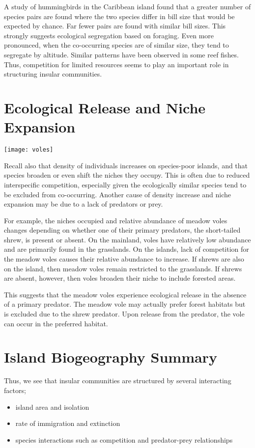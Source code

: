 \documentclass{tufte-handout}
\begin{document}
A study of hummingbirds in the Caribbean island found that a greater number of species pairs are found where the two species differ in bill size that would be expected by chance.  Far fewer pairs are found with similar bill sizes.  This strongly suggests ecological segregation based on foraging.  Even more pronounced, when the co-occurring species are of similar size, they tend to segregate by altitude.  Similar patterns have been observed in some reef fishes.  Thus, competition for limited resources seems to play an important role in structuring insular communities.

\section{Ecological Release and Niche Expansion}
\begin{marginfigure}
	\texttt{[image: voles]}\\
\end{marginfigure}

Recall also that density of individuals increases on species-poor islands, and that species broaden or even shift the niches they occupy.  This is often due to reduced interspecific competition, especially given the ecologically similar species tend to be excluded from co-occurring.  Another cause of density increase and niche expansion may be due to a lack of predators or prey.

For example, the niches occupied and relative abundance of meadow voles changes depending on whether one of their primary predators, the short-tailed shrew, is present or absent.  On the mainland, voles have relatively low abundance and are primarily found in the grasslands.  On the islands, lack of competition for the meadow voles causes their relative abundance to increase.  If shrews are also on the island, then meadow voles remain restricted to the grasslands.  If shrews are absent, however, then voles broaden their niche to include forested areas.

This suggests that the meadow voles experience ecological release in the absence of a primary predator.  The meadow vole may actually prefer forest habitats but is excluded due to the shrew predator.  Upon release from the predator, the vole can occur in the preferred habitat.  

\section{Island Biogeography Summary}

Thus, we see that insular communities are structured by several interacting factors;
\begin{itemize}
	\item island area and isolation
	\item rate of immigration and extinction
	\item species interactions such as competition and predator-prey relationships
\end{itemize}
\end{document}
